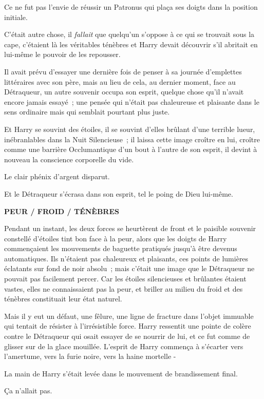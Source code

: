 Ce ne fut pas l'envie de réussir un Patronus qui plaça ses doigts dans la position initiale.

C'était autre chose, il \emph{fallait} que quelqu'un s'oppose à ce qui se trouvait sous la cape, c'étaient là les véritables ténèbres et Harry devait découvrir s'il abritait en lui-même le pouvoir de les repousser.

Il avait prévu d'essayer une dernière fois de penser à sa journée d'emplettes littéraires avec son père, mais au lieu de cela, au dernier moment, face au Détraqueur, un autre souvenir occupa son esprit, quelque chose qu'il n'avait encore jamais essayé~; une pensée qui n'était pas chaleureuse et plaisante dans le sens ordinaire mais qui semblait pourtant plus juste.

Et Harry se souvint des étoiles, il se souvint d'elles brûlant d'une terrible lueur, inébranlables dans la Nuit Silencieuse~; il laissa cette image croître en lui, croître comme une barrière Occlumantique d'un bout à l'autre de son esprit, il devint à nouveau la conscience corporelle du vide.

Le clair phénix d'argent disparut.

Et le Détraqueur s'écrasa dans son esprit, tel le poing de Dieu lui-même.

\textbf{PEUR / FROID / TÉNÈBRES}

Pendant un instant, les deux forces se heurtèrent de front et le paisible souvenir constellé d'étoiles tint bon face à la peur, alors que les doigts de Harry commençaient les mouvements de baguette pratiqués jusqu'à être devenus automatiques. Ils n'étaient pas chaleureux et plaisants, ces points de lumières éclatants sur fond de noir absolu~; mais c'était une image que le Détraqueur ne pouvait pas facilement percer. Car les étoiles silencieuses et brûlantes étaient vastes, elles ne connaissaient pas la peur, et briller au milieu du froid et des ténèbres constituait leur état naturel.

Mais il y eut un défaut, une fêlure, une ligne de fracture dans l'objet immuable qui tentait de résister à l'irrésistible force. Harry ressentit une pointe de colère contre le Détraqueur qui osait essayer de se nourrir de lui, et ce fut comme de glisser sur de la glace mouillée. L'esprit de Harry commença à s'écarter vers l'amertume, vers la furie noire, vers la haine mortelle -

La main de Harry s'était levée dans le mouvement de brandissement final.

Ça n'allait pas.

